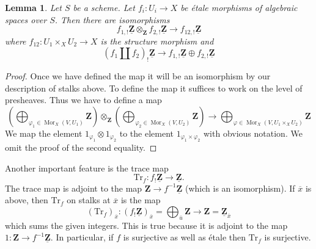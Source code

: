 \documentclass{amsart}
\theoremstyle{plain}
\newtheorem{lemma}[subsection]{Lemma}
\theoremstyle{definition}
\theoremstyle{remark}
\numberwithin{equation}{subsection}
\def\Mor{\mathop{\mathrm{Mor}}\nolimits}
\begin{document}
\begin{lemma}
\label{lemma-product-is-tensor-product}
Let $S$ be a scheme. Let $f_i : U_i \to X$ be \'etale morphisms
of algebraic spaces over $S$. Then there are isomorphisms
$$
f_{1, !}\underline{\mathbf{Z}} \otimes_{\mathbf{Z}}
f_{2, !}\underline{\mathbf{Z}}
\longrightarrow
f_{12, !}\underline{\mathbf{Z}}
$$
where $f_{12} : U_1 \times_X U_2 \to X$ is the structure morphism
and
$$
(f_1 \amalg f_2)_! \underline{\mathbf{Z}}
\longrightarrow
f_{1, !}\underline{\mathbf{Z}} \oplus
f_{2, !}\underline{\mathbf{Z}}
$$
\end{lemma}

\begin{proof}
Once we have defined the map it will be an isomorphism by our description
of stalks above. To define the map it suffices to work on the level of
presheaves. Thus we have to define a map
$$
\left(\bigoplus\nolimits_{\varphi_1 \in \Mor_X(V, U_1)} \mathbf{Z}\right)
\otimes_{\mathbf{Z}}
\left(\bigoplus\nolimits_{\varphi_2 \in \Mor_X(V, U_2)} \mathbf{Z}\right)
\longrightarrow
\bigoplus\nolimits_{\varphi \in \Mor_X(V, U_1 \times_X U_2)}
\mathbf{Z}
$$
We map the element $1_{\varphi_1} \otimes 1_{\varphi_2}$ to the element
$1_{\varphi_1 \times \varphi_2}$ with obvious notation. We omit the proof
of the second equality.
\end{proof}

\noindent
Another important feature is the trace map
$$
\text{Tr}_f : f_!\underline{\mathbf{Z}} \longrightarrow \underline{\mathbf{Z}}.
$$
The trace map is adjoint to the
map $\mathbf{Z} \to f^{-1}\underline{\mathbf{Z}}$ (which is an isomorphism).
If $\overline{x}$ is above, then $\text{Tr}_f$ on stalks at $\overline{x}$
is the map
$$
(\text{Tr}_f)_{\overline{x}} :
(f_!\underline{\mathbf{Z}})_{\overline{x}} =
\bigoplus\nolimits_{\overline{u}} \mathbf{Z}
\longrightarrow
\mathbf{Z} = \underline{\mathbf{Z}}_{\overline{x}}
$$
which sums the given integers. This is true because it is adjoint to the map
$1 : \mathbf{Z} \to f^{-1}\underline{\mathbf{Z}}$. In particular, if
$f$ is surjective as well as \'etale then $\text{Tr}_f$ is surjective.
\end{document}
